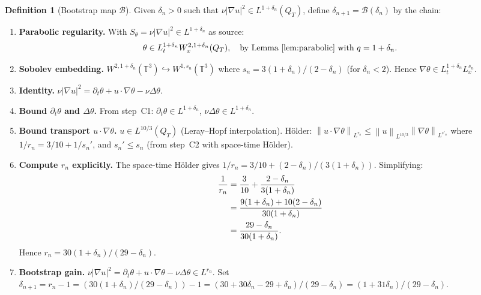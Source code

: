 \documentclass[11pt]{article}
\theoremstyle{definition}
\newtheorem{definition}[theorem]{Definition}
\theoremstyle{remark}
\newcommand{\T}{\mathbb{T}}
\newcommand{\norm}[1]{\left\|#1\right\|}
\newcommand{\prt}{\partial_t}
\newcommand{\grad}{\nabla}
\newcommand{\Sth}{S_\theta}
\begin{document}
\begin{definition}[Bootstrap map $\mathcal{B}$]\label{def:B}
  Given $\delta_n > 0$ such that $\nu|\grad u|^2 \in L^{1+\delta_n}(Q_T)$,
  define $\delta_{n+1} = \mathcal{B}(\delta_n)$ by the chain:
  \begin{enumerate}[label=\textbf{C\arabic*.}]
  \item \textbf{Parabolic regularity.}
    With $\Sth = \nu|\grad u|^2\in L^{1+\delta_n}$ as source:
    \[
      \theta\in L^{1+\delta_n}_t W^{2,1+\delta_n}_x(Q_T),
      \quad \text{by Lemma~\ref{lem:parabolic} with } q=1+\delta_n.
    \]

  \item \textbf{Sobolev embedding.}
    $W^{2,1+\delta_n}(\T^3)\hookrightarrow W^{1,s_n}(\T^3)$ where
    $s_n = 3(1+\delta_n)/(2-\delta_n)$ (for $\delta_n < 2$).
    Hence $\grad\theta\in L^{1+\delta_n}_t L^{s_n}_x$.

  \item \textbf{Identity.}
    $\nu|\grad u|^2 = \prt\theta + u\cdot\grad\theta - \nu\Delta\theta$.

  \item \textbf{Bound $\prt\theta$ and $\Delta\theta$.}
    From step~C1: $\prt\theta\in L^{1+\delta_n}$,
    $\nu\Delta\theta\in L^{1+\delta_n}$.

  \item \textbf{Bound transport $u\cdot\grad\theta$.}
    $u\in L^{10/3}(Q_T)$ (Leray--Hopf interpolation).
    H\"older: $\norm{u\cdot\grad\theta}_{L^{r_n}}\leq\norm{u}_{L^{10/3}}\norm{\grad\theta}_{L^{s'_n}}$
    where $1/r_n = 3/10 + 1/s_n'$, and $s_n'\leq s_n$ (from step~C2
    with space-time H\"older).

  \item \textbf{Compute $r_n$ explicitly.}
    The space-time H\"older gives $1/r_n = 3/10 + (2-\delta_n)/(3(1+\delta_n))$.
    Simplifying:
    \begin{align}
      \frac{1}{r_n} &= \frac{3}{10} + \frac{2-\delta_n}{3(1+\delta_n)}\notag\\
      &= \frac{9(1+\delta_n) + 10(2-\delta_n)}{30(1+\delta_n)}\notag\\
      &= \frac{29 - \delta_n}{30(1+\delta_n)}.
    \end{align}
    Hence $r_n = 30(1+\delta_n)/(29-\delta_n)$.

  \item \textbf{Bootstrap gain.}
    $\nu|\grad u|^2 = \prt\theta + u\cdot\grad\theta - \nu\Delta\theta\in L^{r_n}$.
    Set $\delta_{n+1} = r_n - 1 = (30(1+\delta_n)/(29-\delta_n)) - 1
    = (30 + 30\delta_n - 29 + \delta_n)/(29-\delta_n)
    = (1 + 31\delta_n)/(29-\delta_n)$.
  \end{enumerate}
\end{definition}
\end{document}

